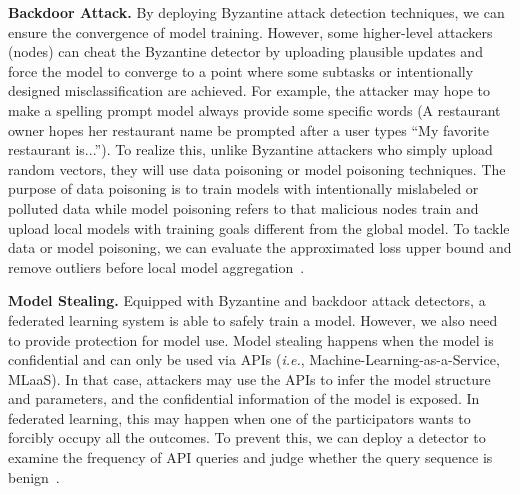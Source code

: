 \documentclass[11pt]{article}
\newcommand{\ie}{\textit{i.e.}\xspace}
\newcommand{\fakeparagraph}[1]{\vspace{1mm}\noindent\textbf{#1.}}
\begin{document}
\fakeparagraph{Backdoor Attack} 
By deploying Byzantine attack detection techniques, we can ensure the convergence of model training. 
However, some higher-level attackers (nodes) can cheat the Byzantine detector by uploading plausible updates and force the model to converge to a point where some subtasks or intentionally designed misclassification are achieved. 
For example, the attacker may hope to make a spelling prompt model always provide some specific words (A restaurant owner hopes her restaurant name be prompted after a user types ``My favorite restaurant is...''). 
To realize this, unlike Byzantine attackers who simply upload random vectors, they will use data poisoning or model poisoning techniques. 
The purpose of data poisoning is to train models with intentionally mislabeled or polluted data while
model poisoning refers to that malicious nodes train and upload local models with training goals different from the global model.
To tackle data or model poisoning, we can evaluate the approximated loss upper bound and remove outliers before local model aggregation~\cite{DBLP:conf/nips/SteinhardtKL17}. 

\fakeparagraph{Model Stealing} 
Equipped with Byzantine and backdoor attack detectors, a federated learning system is able to safely train a model. However, we also need to provide protection for model use. 
Model stealing happens when the model is confidential and can only be used via APIs (\ie, Machine-Learning-as-a-Service, MLaaS). 
In that case, attackers may use the APIs to infer the model structure and parameters, and the confidential information of the model is exposed.
In federated learning, this may happen when one of the participators wants to forcibly occupy all the outcomes. To prevent this, we can deploy a detector to examine the frequency of API queries and judge whether the query sequence is benign~\cite{DBLP:conf/eurosp/JuutiSMA19}.
\end{document}
